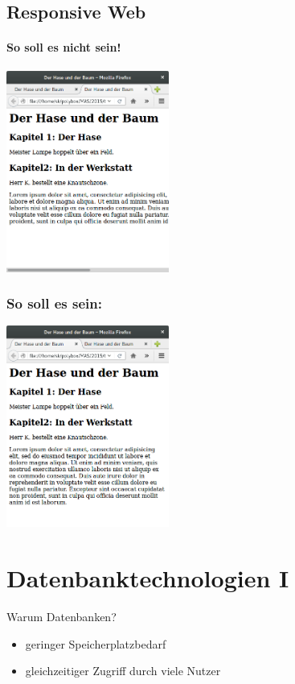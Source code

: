 \subsection{Responsive Web}
\begin{frame}{}
\framesubtitle{So soll es nicht sein!}
  \begin{center}
    \includegraphics[width=0.4\textwidth]{pics/testseite-feste_breite.png}
  \end{center}
\end{frame}
%
\begin{frame}
\frametitle{So soll es sein:}
  \begin{center}
    \includegraphics[width=0.4\textwidth]{pics/testseite-gut.png}
  \end{center}
\end{frame}
%

\section{Datenbanktechnologien I}
%
\begin{frame}[<+->]{Warum Datenbanken?}
  \begin{itemize}
    \pause
    \item geringer Speicherplatzbedarf
    \item gleichzeitiger Zugriff durch viele Nutzer
  \end{itemize}
\end{frame}

